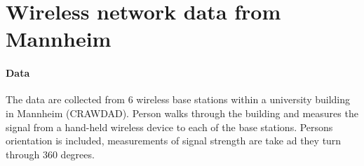 \section{Wireless network data from Mannheim}

\paragraph{Data}
The data are collected from 6 wireless base stations within a 
university building in Mannheim (CRAWDAD). 
Person walks through the building and measures the 
signal from a hand-held wireless device to each of the 
base stations. 
Persons orientation is included, measurements of signal strength
are take ad they turn through 360 degrees. 

